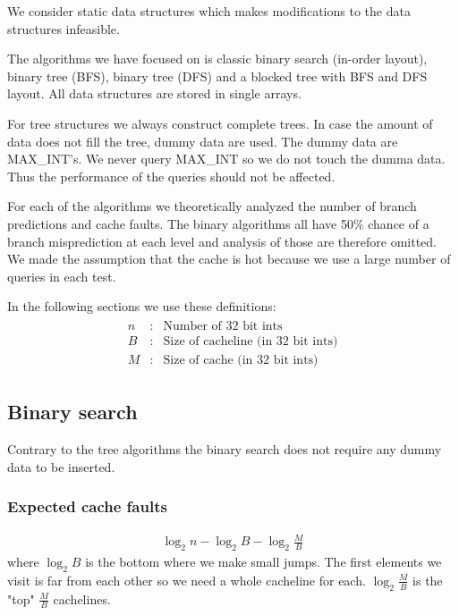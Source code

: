 We consider static data structures which makes modifications to the data structures infeasible.

The algorithms we have focused on is classic binary search (in-order layout), binary tree (BFS), binary tree (DFS) and a blocked tree with BFS and DFS layout. All data structures are stored in single arrays.

For tree structures we always construct complete trees. In case the amount of data does not fill the tree, dummy data are used. The dummy data are MAX\_INT's. We never query MAX\_INT so we do not touch the dumma data. Thus the performance of the queries should not be affected.

For each of the algorithms we theoretically analyzed the number of branch predictions and cache faults. The binary algorithms all have 50\% chance of a branch misprediction at each level and analysis of those are therefore omitted. We made the assumption that the cache is hot because we use a large number of queries in each test.

In the following sections we use these definitions:
\begin{eqnarray*}
\begin{array}{rcl}
n & : & \textrm{Number of 32 bit ints} \\
B & : & \textrm{Size of cacheline (in 32 bit ints)} \\
M & : & \textrm{Size of cache (in 32 bit ints)}
\end{array}
\end{eqnarray*}

\subsection{Binary search}

Contrary to the tree algorithms the binary search does not require any dummy data to be inserted.

\subsubsection*{Expected cache faults}


\begin{eqnarray*}
\log_2 n - \log_2 B - \log_2 \frac{M}{B} 
\end{eqnarray*}
where $\log_2 B$ is the bottom where we make small jumps. The first elements we visit is far from each other so we need a whole cacheline for each. $\log_2 \frac{M}{B}$ is the "top" $\frac{M}{B}$ cachelines.

